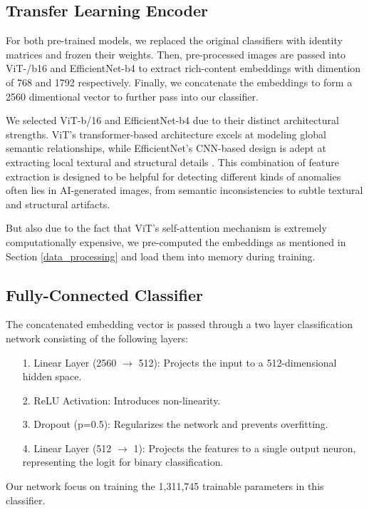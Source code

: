 \documentclass{article} %
\begin{document}
\subsection{Transfer Learning Encoder}
\label{encoder}

For both pre-trained models, we replaced the original classifiers with identity matrices and frozen their weights. Then, pre-processed images are passed into ViT-/b16 and EfficientNet-b4 to extract rich-content embeddings with dimention of 768 and 1792 respectively. Finally, we concatenate the embeddings to form a 2560 dimentional vector to further pass into our classifier.

We selected ViT-b/16 and EfficientNet-b4 due to their distinct architectural strengths. ViT's transformer-based architecture excels at modeling global semantic relationships, while EfficientNet's CNN-based design is adept at extracting local textural and structural details \citep{Idrees_2024}. This combination of feature extraction is designed to be helpful for detecting different kinds of anomalies often lies in AI-generated images, from semantic inconsistencies to subtle textural and structural artifacts.

But also due to the fact that ViT's self-attention mechanism is extremely computationally expensive, we pre-computed the embeddings as mentioned in Section \ref{data_processing} and load them into memory during training.

\subsection{Fully-Connected Classifier}

The concatenated embedding vector is passed through a two layer classification network consisting of the following layers:
\begin{enumerate}
    \item[1.]Linear Layer (2560 $\rightarrow$ 512): Projects the input to a 512-dimensional hidden space.
    \item[2.]ReLU Activation: Introduces non-linearity.
    \item[3.]Dropout (p=0.5): Regularizes the network and prevents overfitting.
    \item[4.]Linear Layer (512 $\rightarrow$ 1): Projects the features to a single output neuron, representing the logit for binary classification.
\end{enumerate}
Our network focus on training the 1,311,745 trainable parameters in this classifier.
\end{document}
